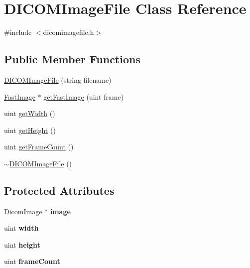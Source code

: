 \hypertarget{class_d_i_c_o_m_image_file}{
\section{DICOMImageFile Class Reference}
\label{class_d_i_c_o_m_image_file}
}


{\ttfamily \#include $<$dicomimagefile.h$>$}

\subsection*{Public Member Functions}
\begin{DoxyCompactItemize}
\item 
\hyperlink{class_d_i_c_o_m_image_file_ae4778b6e6ed2c36f47fe3e785b55bb2e}{DICOMImageFile} (string filename)
\item 
\hyperlink{class_fast_image}{FastImage} $\ast$ \hyperlink{class_d_i_c_o_m_image_file_a05f3f6fc5046ade1848a4d3c6561f6ad}{getFastImage} (uint frame)
\item 
uint \hyperlink{class_d_i_c_o_m_image_file_a4eb4186345395c61c7964e588a08e057}{getWidth} ()
\item 
uint \hyperlink{class_d_i_c_o_m_image_file_abebf0dfb003c75c06c3955e65dd5b9a6}{getHeight} ()
\item 
uint \hyperlink{class_d_i_c_o_m_image_file_aec56b3e9d86b2af4206e38406714941f}{getFrameCount} ()
\item 
\hyperlink{class_d_i_c_o_m_image_file_af210a193559ee3287aa1f9c4bf13d3ab}{$\sim$DICOMImageFile} ()
\end{DoxyCompactItemize}
\subsection*{Protected Attributes}
\begin{DoxyCompactItemize}
\item 
\hypertarget{class_d_i_c_o_m_image_file_ac8700ef1684e13d0d0fe01e603294293}{
DicomImage $\ast$ {\bfseries image}}
\label{class_d_i_c_o_m_image_file_ac8700ef1684e13d0d0fe01e603294293}

\item 
\hypertarget{class_d_i_c_o_m_image_file_af62a20b7e1e3a7a33ddc848b429b64f8}{
uint {\bfseries width}}
\label{class_d_i_c_o_m_image_file_af62a20b7e1e3a7a33ddc848b429b64f8}

\item 
\hypertarget{class_d_i_c_o_m_image_file_ae751485a997fefa6136cfe40255a38c6}{
uint {\bfseries height}}
\label{class_d_i_c_o_m_image_file_ae751485a997fefa6136cfe40255a38c6}

\item 
\hypertarget{class_d_i_c_o_m_image_file_a445cb53cda79233bb1815a96bb3fa97b}{
uint {\bfseries frameCount}}
\label{class_d_i_c_o_m_image_file_a445cb53cda79233bb1815a96bb3fa97b}

\end{DoxyCompactItemize}


